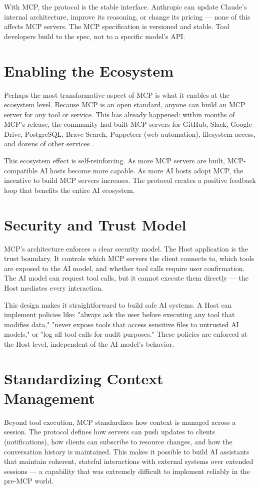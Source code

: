 With MCP, the protocol is the stable interface. Anthropic can update Claude's internal architecture, improve its reasoning, or change its pricing — none of this affects MCP servers. The MCP specification is versioned and stable. Tool developers build to the spec, not to a specific model's API.

\section{Enabling the Ecosystem}
Perhaps the most transformative aspect of MCP is what it enables at the ecosystem level. Because MCP is an open standard, anyone can build an MCP server for any tool or service. This has already happened: within months of MCP's release, the community had built MCP servers for GitHub, Slack, Google Drive, PostgreSQL, Brave Search, Puppeteer (web automation), filesystem access, and dozens of other services \cite{anthropic2024mcp}.

This ecosystem effect is self-reinforcing. As more MCP servers are built, MCP-compatible AI hosts become more capable. As more AI hosts adopt MCP, the incentive to build MCP servers increases. The protocol creates a positive feedback loop that benefits the entire AI ecosystem.

\section{Security and Trust Model}
MCP's architecture enforces a clear security model. The Host application is the trust boundary. It controls which MCP servers the client connects to, which tools are exposed to the AI model, and whether tool calls require user confirmation. The AI model can request tool calls, but it cannot execute them directly — the Host mediates every interaction.

This design makes it straightforward to build safe AI systems. A Host can implement policies like: "always ask the user before executing any tool that modifies data," "never expose tools that access sensitive files to untrusted AI models," or "log all tool calls for audit purposes." These policies are enforced at the Host level, independent of the AI model's behavior.

\section{Standardizing Context Management}
Beyond tool execution, MCP standardizes how context is managed across a session. The protocol defines how servers can push updates to clients (notifications), how clients can subscribe to resource changes, and how the conversation history is maintained. This makes it possible to build AI assistants that maintain coherent, stateful interactions with external systems over extended sessions — a capability that was extremely difficult to implement reliably in the pre-MCP world.

